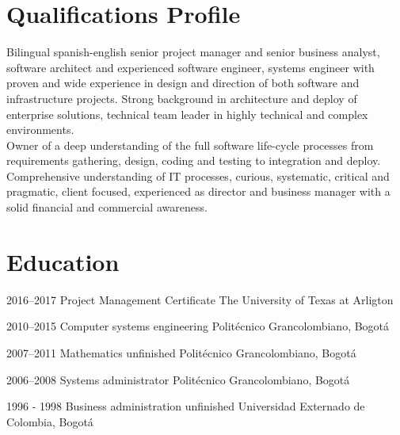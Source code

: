 \documentclass[]{friggeri-cv} %
\begin{document}
\section{Qualifications Profile}
\flushleft
Bilingual spanish-english senior project manager and senior business analyst, software architect and experienced software engineer, systems engineer with proven and wide experience in design and direction of both software and infrastructure projects. Strong background in architecture and deploy of enterprise solutions, technical team leader in highly technical and complex environments.\\
Owner of a deep understanding of the full software life-cycle processes from requirements gathering, design, coding and testing to integration and deploy. Comprehensive understanding of IT processes, curious, systematic, critical and pragmatic, client focused, experienced as director and business manager with a solid financial and commercial awareness.


\section{Education}

\begin{entrylist}


\entry
{2016--2017}
{Project Management Certificate{\normalfont }}
{The University of Texas at Arligton}
{\emph{}}


\entry
{2010--2015}
{Computer systems engineering {\normalfont}}
{Politécnico Grancolombiano, Bogotá}
{}


\entry
{2007--2011}
{Mathematics {\normalfont unfinished}}
{Politécnico Grancolombiano, Bogotá}
{}

\entry
{2006--2008}
{Systems administrator {\normalfont}}
{Politécnico Grancolombiano, Bogotá}
{}


\entry
{1996 - 1998}
{Business administration {\normalfont unfinished}}
{Universidad Externado de Colombia, Bogotá}
{}


\end{entrylist}
\end{document}
